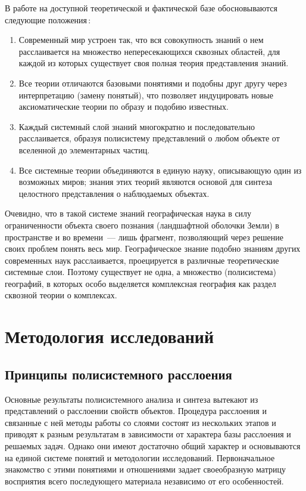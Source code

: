 \documentclass[14pt,draft,openany]{extbook}
\begin{document}
В работе на доступной теоретической и фактической базе обосновываются следующие положения\,:

\begin{enumerate}\bfseries\itemsep0pt 
\item Современный мир устроен так, что вся совокупность знаний о нем расслаивается на множество непересекающихся сквозных областей, для каждой из которых существует своя полная теория представления знаний.

\item Все теории отличаются базовыми понятиями и подобны друг другу через интерпретацию (замену понятый), что позволяет индуцировать новые аксиоматические теории по образу и подобию известных.

\item Каждый системный слой знаний многократно и последовательно расслаивается, образуя полисистему представлений о любом объекте от вселенной до элементарных частиц.

\item Все системные теории объединяются в единую науку, описывающую один из возможных миров; знания этих теорий являются основой для синтеза целостного представления о наблюдаемых объектах.
\end{enumerate}

Очевидно, что в такой системе знаний географическая наука в силу ограниченности объекта своего познания (ландшафтной оболочки Земли) в пространстве и во времени~--- лишь фрагмент, позволяющий через решение своих проблем понять весь мир. Географическое знание подобно знаниям других современных наук расслаивается, проецируется в различные теоретические системные слои.  Поэтому существует не одна, а множество (полисистема) географий, в которых особо выделяется комплексная география как раздел сквозной теории о комплексах.

\part{Методология исследований}
\chapter{Принципы полисистемного расслоения}

Основные результаты полисистемного анализа и синтеза вытекают из представлений о расслоении свойств объектов. Процедура расслоения и связанные с ней методы работы со слоями состоят из нескольких этапов и приводят к разным результатам в зависимости от характера базы расслоения и решаемых задач. Однако они имеют достаточно общий характер и основываются на единой системе понятий и методологии исследований. Первоначальное знакомство с этими понятиями и отношениями задает своеобразную матрицу восприятия всего последующего материала независимо от его особенностей.
\end{document}
